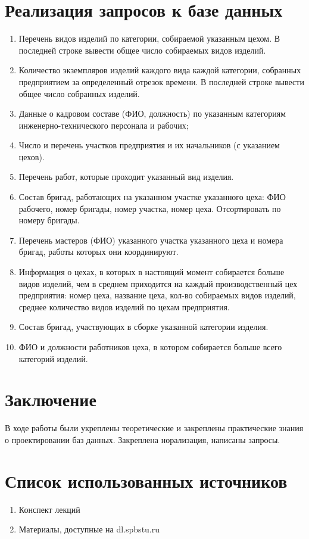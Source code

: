\section{Реализация запросов к базе данных}
\begin{enumerate}

    \item Перечень видов изделий по категории, собираемой указанным цехом.
    В последней строке вывести общее число собираемых видов изделий.

    \item Количество экземпляров изделий каждого вида каждой категории, собранных предприятием за определенный отрезок времени.
    В последней строке вывести общее число собранных изделий.

    \item Данные о кадровом составе (ФИО, должность) по указанным категориям инженерно-технического персонала и рабочих;
    \item Число и перечень участков предприятия и их начальников (с указанием цехов).
    \item Перечень работ, которые проходит указанный вид изделия.
    \item Состав бригад, работающих на указанном участке указанного цеха: ФИО рабочего, номер бригады, номер участка, номер цеха. Отсортировать по номеру бригады.
    \item Перечень мастеров (ФИО) указанного участка указанного цеха и номера бригад, работы которых они координируют.
    \item Информация о цехах, в которых в настоящий момент собирается больше видов изделий, чем в среднем приходится на каждый производственный цех предприятия: номер цеха, название цеха, кол-во собираемых видов изделий, среднее количество видов изделий по цехам предприятия.
    \item Состав бригад, участвующих в сборке указанной категории изделия.
    \item ФИО и должности работников цеха, в котором собирается больше всего категорий изделий.

\end{enumerate}

\section{Заключение}
В ходе работы были укреплены теоретические и закреплены практические знания о проектировании баз данных.
Закреплена норализация, написаны запросы.

\section{Список использованных источников}

\begin{enumerate}

    \item Конспект лекций
    \item Материалы, доступные на dl.spbstu.ru

\end{enumerate}

